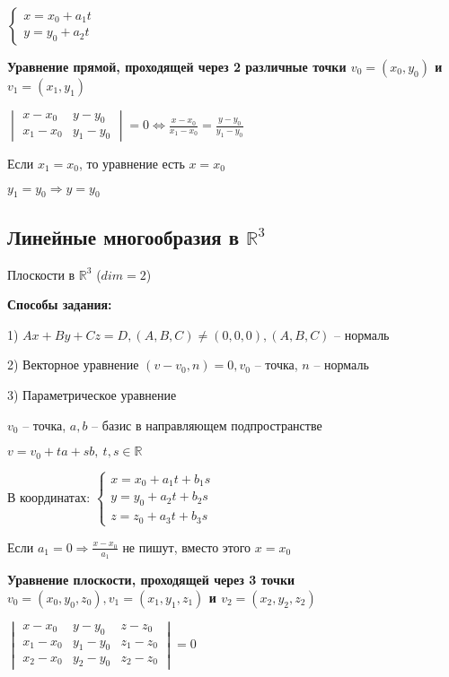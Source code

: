 $\begin{cases} x = x_0 + a_1 t \\ y = y_0 + a_2 t \end{cases}$

\vspace{\baselineskip}
\textbf{Уравнение прямой, проходящей через 2 различные точки $v_0 = (x_0, y_0)$ и $v_1 = (x_1, y_1)$}

$\begin{vmatrix} x - x_0 & y - y_0 \\ x_1 - x_0 & y_1 - y_0 \end{vmatrix} = 0 \Leftrightarrow \frac{x - x_0}{x_1 - x_0} = \frac{y - y_0}{y_1 - y_0}$

\vspace{\baselineskip}
Если $x_1 = x_0$, то уравнение есть $x = x_0$

$y_1 = y_0 \Rightarrow y = y_0$

\subsection{Линейные многообразия в $\mathbb{R}^3$}

Плоскости в $\mathbb{R}^3$ ($dim = 2$)

\textbf{Способы задания:}

1) $Ax + By + Cz = D, (A, B, C) \neq (0, 0, 0), (A, B, C)$ -- нормаль

2) Векторное уравнение $(v - v_0, n) = 0, v_0$ -- точка, $n$ -- нормаль

3) Параметрическое уравнение

$v_0$ -- точка, $a, b$ -- базис в направляющем подпространстве

$v = v_0 + ta + sb, \ t, s \in \mathbb{R}$

В координатах: $\begin{cases} x = x_0 + a_1 t + b_1 s \\ y = y_0 + a_2 t + b_2 s \\ z = z_0 + a_3 t + b_3 s \end{cases}$

Если $a_1 = 0 \Rightarrow \frac{x - x_0}{a_1}$ не пишут, вместо этого $x = x_0$

\vspace{\baselineskip}
\textbf{Уравнение плоскости, проходящей через 3 точки $v_0 = (x_0, y_0, z_0), v_1 = (x_1, y_1, z_1)$ и $v_2 = (x_2, y_2, z_2)$}

$\begin{vmatrix} x - x_0 & y - y_0 & z - z_0 \\ x_1 - x_0 & y_1 - y_0 & z_1 - z_0 \\ x_2 - x_0 & y_2 - y_0 & z_2 - z_0 \end{vmatrix} = 0$

